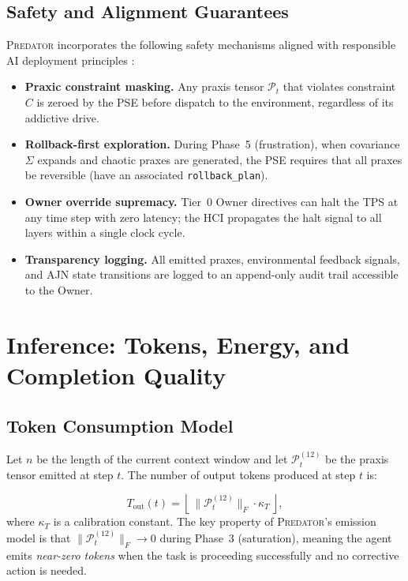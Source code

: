 \documentclass[12pt,a4paper]{article}
\newcommand{\PREDATOR}{\textsc{Predator}}
\begin{document}
\subsection{Safety and Alignment Guarantees}

\PREDATOR{} incorporates the following safety mechanisms aligned with responsible
AI deployment principles \cite{amodei2016concrete, bai2022constitutional}:

\begin{itemize}
  \item \textbf{Praxic constraint masking.} Any praxis tensor $\mathcal{P}_t$
    that violates constraint $C$ is zeroed by the PSE before dispatch to
    the environment, regardless of its addictive drive.
  \item \textbf{Rollback-first exploration.} During Phase~5 (frustration),
    when covariance $\Sigma$ expands and chaotic praxes are generated, the
    PSE requires that all praxes be reversible (have an associated
    \texttt{rollback\_plan}).
  \item \textbf{Owner override supremacy.} Tier~0 Owner directives can halt
    the TPS at any time step with zero latency; the HCI propagates the halt
    signal to all layers within a single clock cycle.
  \item \textbf{Transparency logging.} All emitted praxes, environmental
    feedback signals, and AJN state transitions are logged to an
    append-only audit trail accessible to the Owner.
\end{itemize}

\section{Inference: Tokens, Energy, and Completion Quality}
\label{sec:inference}

\subsection{Token Consumption Model}

Let $n$ be the length of the current context window and let
$\mathcal{P}_t^{(12)}$ be the praxis tensor emitted at step $t$. The number
of output tokens produced at step $t$ is:

\begin{equation}
  T_{\text{out}}(t) = \left\lfloor\,
    \|\mathcal{P}_t^{(12)}\|_F \cdot \kappa_T\,\right\rfloor,
  \label{eq:token_out}
\end{equation}
where $\kappa_T$ is a calibration constant. The key property of
\PREDATOR's emission model is that $\|\mathcal{P}_t^{(12)}\|_F \to 0$ during
Phase~3 (saturation), meaning the agent emits \textit{near-zero tokens} when
the task is proceeding successfully and no corrective action is needed.
\end{document}
